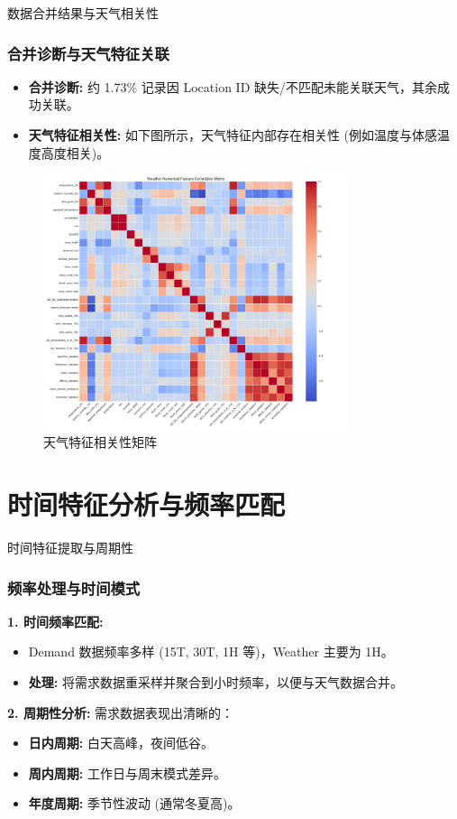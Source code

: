 \documentclass{beamer} %
\begin{document}
\begin{frame}{数据合并结果与天气相关性}
    \frametitle{合并诊断与天气特征关联}
    \begin{itemize}
        \item \textbf{合并诊断:} 约 1.73\% 记录因 Location ID 缺失/不匹配未能关联天气，其余成功关联。
        \item \textbf{天气特征相关性:} 如下图所示，天气特征内部存在相关性 (例如温度与体感温度高度相关)。
    \end{itemize}
     \begin{figure}[H]
        \centering
        \includegraphics[width=0.8\textwidth]{../plots/weather_correlation_matrix.png}
        \caption{天气特征相关性矩阵}
    \end{figure}
\end{frame}


\section{时间特征分析与频率匹配} %

\begin{frame}{时间特征提取与周期性}
    \frametitle{频率处理与时间模式}
    \textbf{1. 时间频率匹配:}
    \begin{itemize}
        \item Demand 数据频率多样 (15T, 30T, 1H 等)，Weather 主要为 1H。
        \item \textbf{处理:} 将需求数据重采样并聚合到小时频率，以便与天气数据合并。
    \end{itemize}

    \textbf{2. 周期性分析:} 需求数据表现出清晰的：
    \begin{itemize}
        \item \textbf{日内周期:} 白天高峰，夜间低谷。
        \item \textbf{周内周期:} 工作日与周末模式差异。
        \item \textbf{年度周期:} 季节性波动 (通常冬夏高)。
    \end{itemize}
\end{frame}
\end{document}
